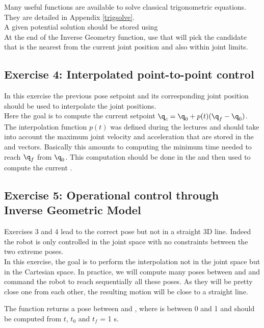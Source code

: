 \documentclass{ecnreport}
\begin{document}
  Many useful functions are available to solve classical trigonometric equations. They are detailed in Appendix \ref{trigsolve}.\\
  
  A given potential solution should be stored using \\ At the end of the Inverse Geometry function, use  that will pick the candidate that is the nearest from the current joint position and also within joint limits.
  
  \subsection*{Exercise 4: Interpolated point-to-point control}
  
  In this exercise the previous pose setpoint  and its corresponding joint position  should be used to interpolate the joint positions.\\
  
  Here the goal is to compute the current setpoint $\q_c = \q_0 + p(t)(\q_f-\q_0)$. The interpolation function $p(t)$ was defined during the lectures and should take into account the maximum joint velocity and acceleration that are stored in the  and  vectors. Basically this amounts to computing the minimum time  needed to reach $\q_f$ from $\q_0$. This computation should be done in the  and then used to compute the current .
  
  
  \subsection*{Exercise 5: Operational control through Inverse Geometric Model}
  
  Exercises 3 and 4 lead to the correct pose but not in a straight 3D line. Indeed the robot is only controlled in the joint space with no constraints between the two extreme poses.\\
  In this exercise, the goal is to perform the interpolation not in the joint space but in the Cartesian space. In practice, we will compute many poses between 
   and  and command the robot to reach sequentially all these poses. As they will be pretty close one from each other, the resulting motion 
  will be close to a straight line.
  
  The  function returns a pose between  and , where  is between 0 and 1 and should be computed from $t$, $t_0$ and $t_f$ = 1 s.
  
\end{document}
